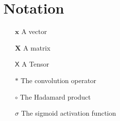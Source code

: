 \documentclass[./main.tex]{subfiles}
\begin{document}
\section*{Notation}
\begin{itemize}[leftmargin=2.0cm,labelsep=0.5cm]
    \item[$\bm{x}$] A vector
    \item[$\bm{X}$] A matrix
    \item[$\mathsf{X}$] A Tensor 
    \item[$*$] The convolution operator
    \item[$\circ$] The Hadamard product  
    \item[$\sigma$] The sigmoid activation function 
\end{itemize}
\end{document}
